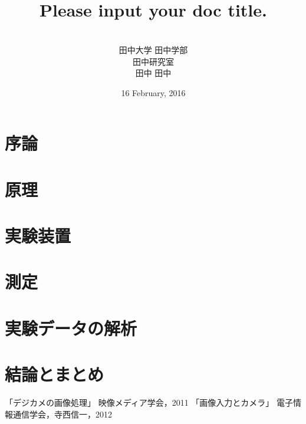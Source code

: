 \documentclass[uplatex,a4paper,12pt]{ujreport}
\title{
	\vspace{1cm}{\Large 卒業論文}
	\\
	\vspace{2.5zw}
	{\LARGE
		Please input your doc title.
	}
}
\author{
	\vspace{5cm}
	\\
	田中大学 田中学部
	\\
	田中研究室
	\\
	田中 田中
}
\date{16 February, 2016}
\begin{document}
\maketitle

\renewcommand{\abstractname}{{\huge\mc 概要}}
\begin{abstract}
	
\end{abstract}

\setcounter{tocdepth}{2}
\tableofcontents

\chapter{序論}
	
\chapter{原理}
	
\chapter{実験装置}
	
\chapter{測定}
	
\chapter{実験データの解析}
	
\chapter{結論とまとめ}
	

\clearpage
	
\clearpage


\renewcommand{\bibname}{参考文献}

\begin{thebibliography}{99}
	「デジカメの画像処理」 映像メディア学会，2011
	「画像入力とカメラ」 電子情報通信学会，寺西信一，2012
\end{thebibliography}
\end{document}
